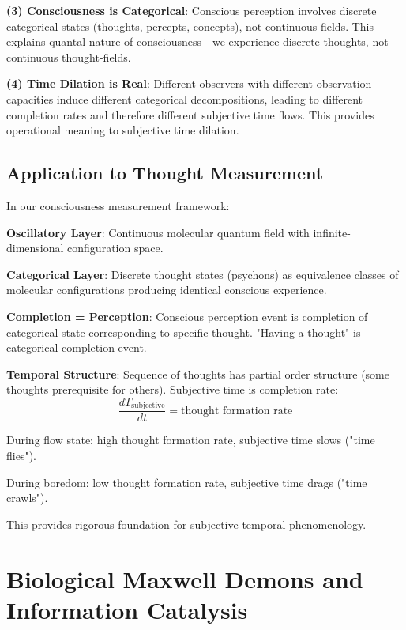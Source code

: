\documentclass[11pt,onecolumn]{article}
\begin{document}
\textbf{(3) Consciousness is Categorical}: Conscious perception involves discrete categorical states (thoughts, percepts, concepts), not continuous fields. This explains quantal nature of consciousness---we experience discrete thoughts, not continuous thought-fields.

\textbf{(4) Time Dilation is Real}: Different observers with different observation capacities induce different categorical decompositions, leading to different completion rates and therefore different subjective time flows. This provides operational meaning to subjective time dilation.

\subsection{Application to Thought Measurement}

In our consciousness measurement framework:

\textbf{Oscillatory Layer}: Continuous  molecular quantum field with infinite-dimensional configuration space.

\textbf{Categorical Layer}: Discrete thought states (psychons) as equivalence classes of molecular configurations producing identical conscious experience.

\textbf{Completion = Perception}: Conscious perception event is completion of categorical state corresponding to specific thought. "Having a thought" is categorical completion event.

\textbf{Temporal Structure}: Sequence of thoughts has partial order structure (some thoughts prerequisite for others). Subjective time is completion rate:
\begin{equation}
\frac{dT_{\text{subjective}}}{dt} = \text{thought formation rate}
\end{equation}

During flow state: high thought formation rate, subjective time slows ("time flies").

During boredom: low thought formation rate, subjective time drags ("time crawls").

This provides rigorous foundation for subjective temporal phenomenology.

\clearpage

\section{Biological Maxwell Demons and Information Catalysis}
\end{document}
